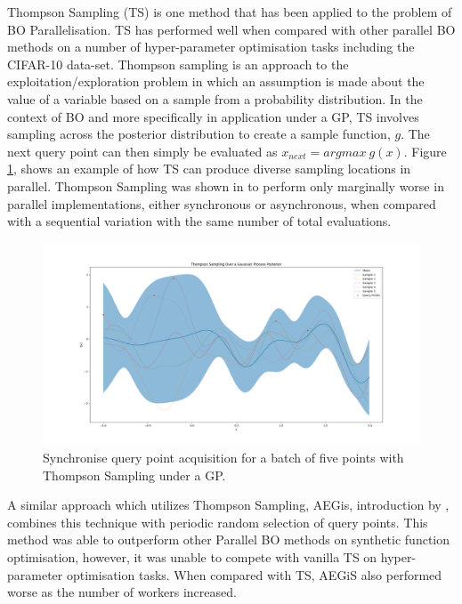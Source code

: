 \documentclass{article}
\begin{document}
			Thompson Sampling (TS) is one method that has been applied to the problem of BO Parallelisation\cite{26}\cite{27}. TS has performed well when compared with other parallel BO methods on a number of hyper-parameter optimisation tasks including the CIFAR-10 data-set. 
			Thompson sampling is an approach to the exploitation/exploration problem in which an assumption is made about the value of a variable based on a sample from a probability distribution. In the context of BO and more specifically in application under a GP, TS involves sampling across the posterior distribution to create a sample function, \(g\). The next query point can then simply be evaluated as \(x_{next} = argmax ~g(x)\). Figure \ref{fig:TS1}, shows an example of how TS can produce diverse sampling locations in parallel. Thompson Sampling was shown in \cite{27} to perform only marginally worse in parallel implementations, either synchronous or asynchronous, when compared with a sequential variation with the same number of total evaluations.



			\begin{figure}[h]	


			\includegraphics[trim=20 0 0 0 ,scale=0.25]{TS.png}

			\caption{Synchronise query point acquisition for a batch of five points with Thompson Sampling under a GP.}
			\label{fig:TS1}

			\end{figure}


			A similar approach which utilizes Thompson Sampling, AEGis, introduction by \cite{26}, combines this technique with periodic random selection of query points. This method was able to outperform other Parallel BO methods on synthetic function optimisation, however, it was unable to compete with vanilla TS on hyper-parameter optimisation tasks. When compared with TS, AEGiS also performed worse as the number of workers increased.
\end{document}
